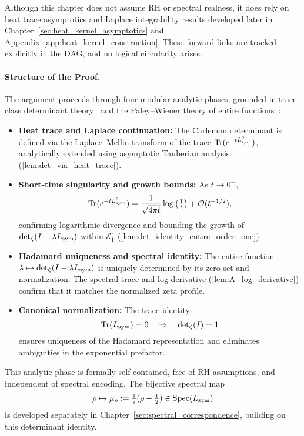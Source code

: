 \begin{remark}
Although this chapter does not assume RH or spectral realness, it does rely on heat trace asymptotics and Laplace integrability results developed later in Chapter~\ref{sec:heat_kernel_asymptotics} and Appendix~\ref{app:heat_kernel_construction}. These forward links are tracked explicitly in the DAG, and no logical circularity arises.
\end{remark}

\paragraph{Structure of the Proof.}
The argument proceeds through four modular analytic phases, grounded in trace-class determinant theory~\cite[Ch.~4]{Simon2005TraceIdeals} and the Paley--Wiener theory of entire functions~\cite[Ch.~9]{Levin1996EntireLectures}:

\begin{itemize}
  \item \textbf{Heat trace and Laplace continuation:} The Carleman determinant is defined via the Laplace--Mellin transform of the trace \( \operatorname{Tr}(e^{-t L_{\mathrm{sym}}^2}) \), analytically extended using asymptotic Tauberian analysis (\cref{lem:det_via_heat_trace}).

  \item \textbf{Short-time singularity and growth bounds:} As \( t \to 0^+ \),
  \[
  \operatorname{Tr}(e^{-t L_{\mathrm{sym}}^2}) = \frac{1}{\sqrt{4\pi t}} \log\left(\tfrac{1}{t}\right) + \mathcal{O}(t^{-1/2}),
  \]
  confirming logarithmic divergence and bounding the growth of \( \det\nolimits_{\zeta}(I - \lambda L_{\mathrm{sym}}) \) within \( \mathcal{E}_1^\pi \) (\cref{lem:det_identity_entire_order_one}).

  \item \textbf{Hadamard uniqueness and spectral identity:} The entire function \( \lambda \mapsto \det\nolimits_{\zeta}(I - \lambda L_{\mathrm{sym}}) \) is uniquely determined by its zero set and normalization. The spectral trace and log-derivative (\cref{lem:A_log_derivative}) confirm that it matches the normalized zeta profile.

  \item \textbf{Canonical normalization:} The trace identity
  \[
  \operatorname{Tr}(L_{\mathrm{sym}}) = 0 \quad \Rightarrow \quad \det\nolimits_{\zeta}(I) = 1
  \]
  ensures uniqueness of the Hadamard representation and eliminates ambiguities in the exponential prefactor.
\end{itemize}

This analytic phase is formally self-contained, free of RH assumptions, and independent of spectral encoding. The bijective spectral map
\[
\rho \mapsto \mu_\rho := \tfrac{1}{i}(\rho - \tfrac{1}{2}) \in \operatorname{Spec}(L_{\mathrm{sym}})
\]
is developed separately in Chapter~\ref{sec:spectral_correspondence}, building on this determinant identity.
